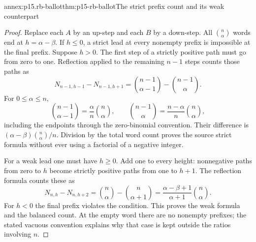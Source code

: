\begin{annexitem}{annex:p15.rb-ballot}{thm:p15-rb-ballot}{The strict prefix count and its weak counterpart}
\begin{proof}
Replace each \(A\) by an up-step and each \(B\) by a down-step.
All \(\binom n\alpha\) words end at \(h=\alpha-\beta\).
If \(h\leq0\), a strict lead at every nonempty prefix is
impossible at the final prefix.
Suppose \(h>0\). The first step of a strictly positive path
must go from zero to one. Reflection applied to the remaining
\(n-1\) steps counts those paths as
\[
 N_{n-1,h-1}-N_{n-1,h+1}
       =\binom{n-1}{\alpha-1}-\binom{n-1}{\alpha}.
 \]
For \(0\leq\alpha\leq n\),
\[
 \binom{n-1}{\alpha-1}=\frac\alpha n\binom n\alpha,\qquad
 \binom{n-1}{\alpha}=\frac{n-\alpha}{n}\binom n\alpha,
 \]
including the endpoints through the zero-binomial convention.
Their difference is
\((\alpha-\beta)\binom n\alpha/n\).
Division by the total word count proves the source strict formula
without ever using a factorial of a negative integer.

For a weak lead one must have \(h\geq0\).
Add one to every height: nonnegative paths from zero to \(h\)
become strictly positive paths from one to \(h+1\).
The reflection formula counts these as
\[
 N_{n,h}-N_{n,h+2}
       =\binom n\alpha-\binom n{\alpha+1}
       =\frac{\alpha-\beta+1}{\alpha+1}\binom n\alpha.
 \]
For \(h<0\) the final prefix violates the condition.
This proves the weak formula and the balanced count.
At the empty word there are no nonempty prefixes; the stated
vacuous convention explains why that case is kept outside the
ratios involving \(n\).
\end{proof}
\end{annexitem}

